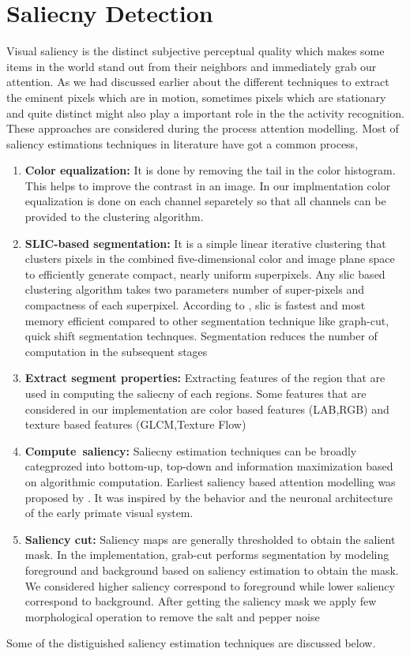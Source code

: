 \documentclass[MTech]{iitmdiss}
\begin{document}
\chapter{Saliecny Detection}
Visual saliency is the distinct subjective perceptual quality which makes some items in the world stand out from their neighbors and immediately grab our attention.
As we had discussed earlier about the different techniques to extract the eminent pixels which are in motion, sometimes pixels which are stationary and quite distinct might also play a important role in the the activity recognition. These approaches are considered during the process attention modelling. Most of saliency estimations techniques in literature have got a common process,
\begin{enumerate}
	\item{\textbf{Color equalization:} It is done by removing the tail in the color histogram. This helps to improve the contrast in an image. In our implmentation color equalization is done on each channel separetely so that all channels can be provided to the clustering algorithm.}
	\item{\textbf{SLIC-based segmentation:}  It is a simple linear iterative clustering that clusters pixels in the combined five-dimensional color and image plane space to efficiently generate compact, nearly uniform superpixels. Any slic based clustering algorithm takes two parameters number of super-pixels and compactness of each superpixel. According to \cite{slic}, slic is fastest and most memory efficient compared to  other segmentation technique like graph-cut, quick shift segmentation technques. Segmentation reduces the number of computation in the subsequent stages}
	\item{\textbf{Extract segment properties:} Extracting features of the region that are used in computing the saliecny of each regions. Some features that are considered in our implementation are color based features (LAB,RGB) and texture based features (GLCM,Texture Flow)}
	\item{\textbf{Compute~saliency:} Saliecny estimation techniques can be broadly categprozed into bottom-up, top-down and information maximization based on algorithmic computation. Earliest saliency based attention modelling was proposed by \cite{itti}. It was inspired by the behavior and the neuronal architecture of the early primate visual system.}
	\item{\textbf{Saliency cut:} Saliency maps are generally thresholded to obtain the salient mask. In the implementation, grab-cut\citep{grabcut} performs segmentation by modeling foreground and background based on saliency estimation to obtain the mask. We considered higher saliency  correspond to foreground while lower saliency correspond to background. After getting the saliency mask we apply few morphological operation to remove the salt and pepper noise}
\end{enumerate} 
\par Some of the distiguished saliency estimation techniques are discussed below. 
\end{document}
